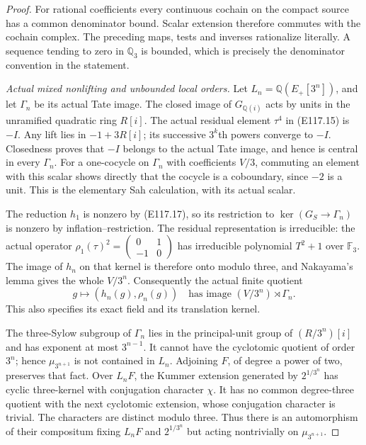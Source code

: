 \begin{proof}
For rational coefficients every continuous cochain on the
compact source has a common denominator bound.
Scalar extension therefore commutes with the cochain complex.
The preceding maps, tests and inverses rationalize literally.
A sequence tending to zero in $\mathbb Q_3$ is bounded, which
is precisely the denominator convention in the statement.

\emph{Actual mixed nonlifting and unbounded local orders.}
Let $L_n=\mathbb Q(E_+[3^n])$, and let $\Gamma_n$ be its
actual Tate image.  The closed image of $G_{\mathbb Q(i)}$
acts by units in the unramified quadratic ring $R[i]$.
The actual residual element $\tau^4$ in (E117.15) is $-I$.
Any lift lies in $-1+3R[i]$; its successive $3^k$th powers converge to $-I$.
Closedness proves that $-I$ belongs to the actual Tate image,
and hence is central in every $\Gamma_n$.
For a one-cocycle on $\Gamma_n$ with coefficients $V/3$,
commuting an element with this scalar shows directly that
the cocycle is a coboundary, since $-2$ is a unit.
This is the elementary Sah calculation, with its actual scalar.

The reduction $h_1$ is nonzero by (E117.17), so its restriction
to $\ker(G_S\to\Gamma_n)$ is nonzero by inflation--restriction.
The residual representation is irreducible: the actual operator
$\rho_1(\tau)^2=\left(\begin{smallmatrix}0&1\\-1&0\end{smallmatrix}\right)$
has irreducible polynomial $T^2+1$ over $\mathbb F_3$.  The image of $h_n$ on that kernel is
therefore onto modulo three, and Nakayama's lemma gives the
whole $V/3^n$.  Consequently the actual finite quotient
\[
 g\longmapsto(h_n(g),\rho_n(g))
 \quad\text{has image }(V/3^n)\rtimes\Gamma_n.
 \tag{E117.39}
\]
This also specifies its exact field and its translation kernel.

The three-Sylow subgroup of $\Gamma_n$ lies in the principal-unit
group of $(R/3^n)[i]$ and has exponent at most $3^{n-1}$.
It cannot have the cyclotomic quotient of order $3^n$;
hence $\mu_{3^{n+1}}$ is not contained in $L_n$.
Adjoining $F$, of degree a power of two, preserves that fact.
Over $L_nF$, the Kummer extension generated by $2^{1/3^n}$
has cyclic three-kernel with conjugation character $\chi$.
It has no common degree-three quotient with the next
cyclotomic extension, whose conjugation character is trivial.
The characters are distinct modulo three.
Thus there is an automorphism of their compositum fixing
$L_nF$ and $2^{1/3^n}$ but acting nontrivially on
$\mu_{3^{n+1}}$.


\end{proof}
